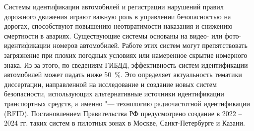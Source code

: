 




{\actuality} Системы идентификации автомобилей и регистрации нарушений правил дорожного движения играют важную роль в управлении безопасностью на дорогах, способствуют повышению неотвратимости наказания и снижению смертности в авариях. Существующие системы основаны на видео- или фото-идентификации номеров автомобилей. Работе этих систем могут препятствовать загрязнение при плохих погодных условиях или намеренное скрытие номерного знака. Из-за этого, по сведениям ГИБДД, эффективность систем идентификации автомобилей может падать ниже 50~\%. Это определяет актуальность тематики диссертации, направленной на исследование и создание новых систем безопасности, использующих альтернативные источники идентификации транспортных средств, а именно "--- технологию радиочастотной идентификации (RFID). Постановлением Правительства РФ предусмотрено создание в 2022 -- 2024 гг. таких систем в пилотных зонах в Москве, Санкт-Петербурге и Казани.

